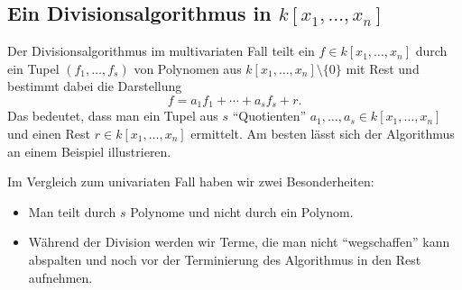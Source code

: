 \documentclass[11pt]{article}
\numberwithin{equation}{section}
\begin{document}




\subsection{Ein Divisionsalgorithmus in $k[x_1,\ldots,x_n]$} 

Der Divisionsalgorithmus im multivariaten Fall teilt ein $f \in k[x_1,\ldots,x_n]$ durch ein Tupel $(f_1,\ldots,f_s)$ von Polynomen aus $k[x_1,\ldots,x_n] \setminus \{0\}$ mit Rest und bestimmt dabei die Darstellung 
\[
	  f= a_1 f_1 + \cdots + a_s f_s + r.
\]
Das bedeutet, dass man ein Tupel aus $s$ ``Quotienten'' $a_1,\ldots,a_s \in k[x_1,\ldots,x_n]$ und einen Rest $r \in k[x_1,\ldots,x_n]$ ermittelt. Am besten lässt sich der Algorithmus an einem Beispiel illustrieren. 

Im Vergleich zum univariaten Fall haben wir zwei Besonderheiten: 
\begin{itemize}
	\item Man teilt durch $s$ Polynome und nicht durch ein Polynom. 
	\item Während der Division werden wir Terme, die man nicht ``wegschaffen'' kann abspalten und noch vor der Terminierung des Algorithmus in den Rest aufnehmen.
\end{itemize} 
\end{document}
